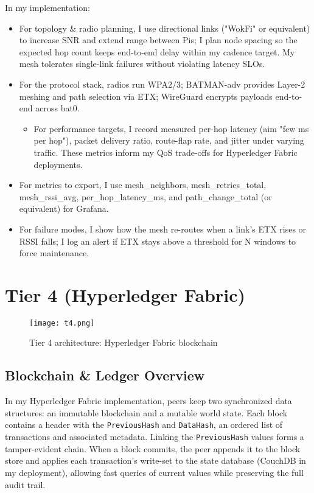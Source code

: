 \documentclass[12pt]{article}
\begin{document}
In my implementation:

\begin{itemize}
\item For topology \& radio planning, I use directional links ("WokFi" or equivalent) to increase SNR and extend range between Pis; I plan node spacing so the expected hop count keeps end-to-end delay within my cadence target. My mesh tolerates single-link failures without violating latency SLOs.
\item For the protocol stack, radios run WPA2/3; BATMAN-adv provides Layer-2 meshing and path selection via ETX; WireGuard encrypts payloads end-to-end across bat0.
  \begin{itemize}
  \item For performance targets, I record measured per-hop latency (aim "few ms per hop"), packet delivery ratio, route-flap rate, and jitter under varying traffic. These metrics inform my QoS trade-offs for Hyperledger Fabric deployments.
  \end{itemize}
\item For metrics to export, I use mesh\_neighbors, mesh\_retries\_total, mesh\_rssi\_avg, per\_hop\_latency\_ms, and path\_change\_total (or equivalent) for Grafana.
\item For failure modes, I show how the mesh re-routes when a link's ETX rises or RSSI falls; I log an alert if ETX stays above a threshold for N windows to force maintenance.
\end{itemize}

\section{Tier 4 (Hyperledger Fabric)}

\begin{figure}[H]
\centering
\texttt{[image: t4.png]}
\caption{Tier 4 architecture: Hyperledger Fabric blockchain}
\end{figure}
\vspace{-0.5cm} %

\subsection{Blockchain \& Ledger Overview}

In my Hyperledger Fabric implementation, peers keep two synchronized data structures: an immutable blockchain and a mutable world state. Each block contains a header with the \texttt{PreviousHash} and \texttt{DataHash}, an ordered list of transactions and associated metadata. Linking the \texttt{PreviousHash} values forms a tamper-evident chain. When a block commits, the peer appends it to the block store and applies each transaction's write-set to the state database (CouchDB in my deployment), allowing fast queries of current values while preserving the full audit trail.
\end{document}

